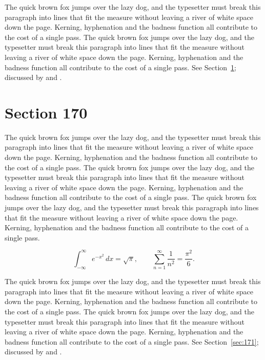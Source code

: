 \documentclass{article}
\begin{document}
The quick brown fox jumps over the lazy dog, and the typesetter must break this paragraph into lines that fit the measure without leaving a river of white space down the page. Kerning, hyphenation and the badness function all contribute to the cost of a single pass. The quick brown fox jumps over the lazy dog, and the typesetter must break this paragraph into lines that fit the measure without leaving a river of white space down the page. Kerning, hyphenation and the badness function all contribute to the cost of a single pass. 
See Section~\ref{sec:170}; discussed by \textcite{k5} and \textcite{l2}.
\section{Section 170}
\label{sec:170}
The quick brown fox jumps over the lazy dog, and the typesetter must break this paragraph into lines that fit the measure without leaving a river of white space down the page. Kerning, hyphenation and the badness function all contribute to the cost of a single pass. The quick brown fox jumps over the lazy dog, and the typesetter must break this paragraph into lines that fit the measure without leaving a river of white space down the page. Kerning, hyphenation and the badness function all contribute to the cost of a single pass. The quick brown fox jumps over the lazy dog, and the typesetter must break this paragraph into lines that fit the measure without leaving a river of white space down the page. Kerning, hyphenation and the badness function all contribute to the cost of a single pass. 

\begin{equation}\label{eq:170}
\int_{-\infty}^{\infty} e^{-x^{2}}\,dx = \sqrt{\pi}, \qquad
\sum_{n=1}^{\infty} \frac{1}{n^{2}} = \frac{\pi^{2}}{6}.
\end{equation}

The quick brown fox jumps over the lazy dog, and the typesetter must break this paragraph into lines that fit the measure without leaving a river of white space down the page. Kerning, hyphenation and the badness function all contribute to the cost of a single pass. The quick brown fox jumps over the lazy dog, and the typesetter must break this paragraph into lines that fit the measure without leaving a river of white space down the page. Kerning, hyphenation and the badness function all contribute to the cost of a single pass. 
See Section~\ref{sec:171}; discussed by \textcite{k1} and \textcite{l3}.
\end{document}
